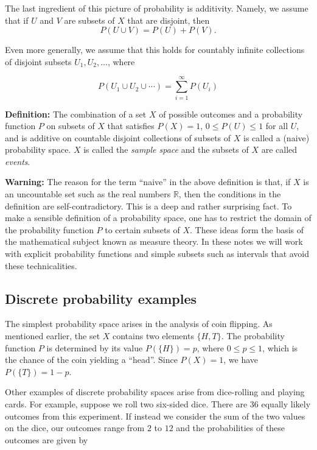 \documentclass[
  11pt,
  letterpaper,
]{scrbook}
\theoremstyle{plain}
\theoremstyle{remark}
\begin{document}
The last ingredient of this picture of probability is additivity.
Namely, we assume that if \(U\) and \(V\) are subsets of \(X\) that are
disjoint, then \[
P(U\cup V)=P(U)+P(V).
\]

Even more generally, we assume that this holds for countably infinite
collections of disjoint subsets \(U_1,U_2,\ldots\), where

\[
P(U_1\cup U_2\cup\cdots)=\sum_{i=1}^{\infty} P(U_i)
\]

\textbf{Definition:} The combination of a set \(X\) of possible outcomes
and a probability function \(P\) on subsets of \(X\) that satisfies
\(P(X)=1\), \(0\le P(U)\le 1\) for all \(U\), and is additive on
countable disjoint collections of subsets of \(X\) is called a (naive)
probability space. \(X\) is called the \emph{sample space} and the
subsets of \(X\) are called \emph{events}.

\textbf{Warning:} The reason for the term ``naive'' in the above
definition is that, if \(X\) is an uncountable set such as the real
numbers \(\mathbb{R}\), then the conditions in the definition are
self-contradictory. This is a deep and rather surprising fact. To make a
sensible definition of a probability space, one has to restrict the
domain of the probability function \(P\) to certain subsets of \(X\).
These ideas form the basis of the mathematical subject known as measure
theory. In these notes we will work with explicit probability functions
and simple subsets such as intervals that avoid these technicalities.

\hypertarget{discrete-probability-examples}{%
\subsection{Discrete probability
examples}\label{discrete-probability-examples}}

The simplest probability space arises in the analysis of coin flipping.
As mentioned earlier, the set \(X\) contains two elements \(\{H,T\}\).
The probability function \(P\) is determined by its value
\(P(\{H\})=p\), where \(0\le p\le 1\), which is the chance of the coin
yielding a ``head''. Since \(P(X)=1\), we have \(P(\{T\})=1-p\).

Other examples of discrete probability spaces arise from dice-rolling
and playing cards. For example, suppose we roll two six-sided dice.
There are \(36\) equally likely outcomes from this experiment. If
instead we consider the sum of the two values on the dice, our outcomes
range from \(2\) to \(12\) and the probabilities of these outcomes are
given by
\end{document}
